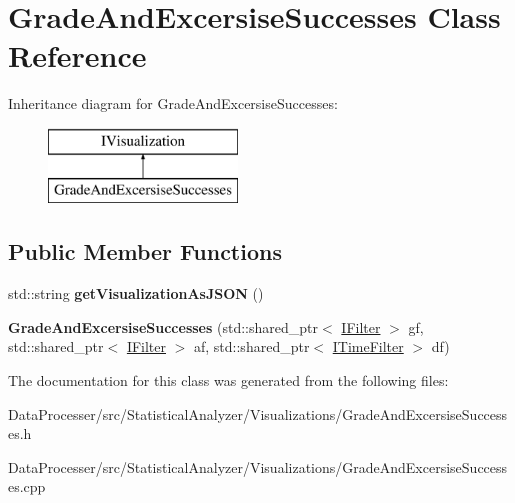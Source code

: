 \hypertarget{classGradeAndExcersiseSuccesses}{}\section{Grade\+And\+Excersise\+Successes Class Reference}
\label{classGradeAndExcersiseSuccesses}
Inheritance diagram for Grade\+And\+Excersise\+Successes\+:\begin{figure}[H]
\begin{center}
\leavevmode
\includegraphics[height=2.000000cm]{classGradeAndExcersiseSuccesses}
\end{center}
\end{figure}
\subsection*{Public Member Functions}
\begin{DoxyCompactItemize}
\item 
\mbox{\label{classGradeAndExcersiseSuccesses_a98ca9e2045f7d15e9a90a03fb7ea30ce}} 
std\+::string {\bfseries get\+Visualization\+As\+J\+S\+ON} ()
\item 
\mbox{\label{classGradeAndExcersiseSuccesses_a0d735be765216f11a24d829c383373f8}} 
{\bfseries Grade\+And\+Excersise\+Successes} (std\+::shared\+\_\+ptr$<$ \hyperlink{classIFilter}{I\+Filter} $>$ gf, std\+::shared\+\_\+ptr$<$ \hyperlink{classIFilter}{I\+Filter} $>$ af, std\+::shared\+\_\+ptr$<$ \hyperlink{classITimeFilter}{I\+Time\+Filter} $>$ df)
\end{DoxyCompactItemize}


The documentation for this class was generated from the following files\+:\begin{DoxyCompactItemize}
\item 
Data\+Processer/src/\+Statistical\+Analyzer/\+Visualizations/Grade\+And\+Excersise\+Successes.\+h\item 
Data\+Processer/src/\+Statistical\+Analyzer/\+Visualizations/Grade\+And\+Excersise\+Successes.\+cpp\end{DoxyCompactItemize}
